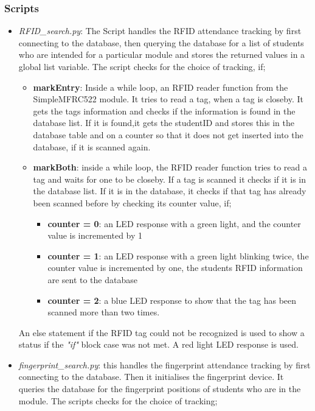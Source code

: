 \subsubsection*{Scripts}
\begin{itemize}
\item \textit{RFID\_search.py}: The Script handles the RFID attendance tracking by first connecting to the database, then querying the database for a list of students who are intended for a particular module and stores the returned values in a global list variable. The script checks for the choice of tracking, if;
\begin{itemize}
  \item \textbf{markEntry}: Inside a while loop, an RFID reader function from the SimpleMFRC522 module. It tries to read a tag, when a tag is closeby. It gets the tags information and checks if the information is found in the database list. If it is found,it gets the studentID and stores this in the database table and on a counter so that it does not get inserted into the database, if it is scanned again.
  \item \textbf{markBoth}: inside a while loop, the RFID reader function tries to read a tag and waits for one to be closeby. If a tag is scanned it checks if it is in the database list. If it is in the database, it checks if that tag has already been scanned before by checking its counter value, if;
  \begin{itemize}
    \item \textbf{counter = 0}: an LED response with a green light, and the counter value is incremented by 1
    \item \textbf{counter = 1}: an LED response with a green light blinking twice, the counter value is incremented by one, the students RFID information are sent to the database
    \item \textbf{counter = 2}: a blue LED response to show that the tag has been scanned more than two times.
  \end{itemize}
\end{itemize}
An else statement if the RFID tag could not be recognized is used to show a status if the \textit{"if"} block case was not met. A red light LED response is used.
\item \textit{fingerprint\_search.py}: this handles the fingerprint attendance tracking by first connecting to the database. Then it initialises the fingerprint device. It queries the database for the fingerprint positions of students who are in the module. The scripts checks for the choice of tracking;

\end{itemize}
